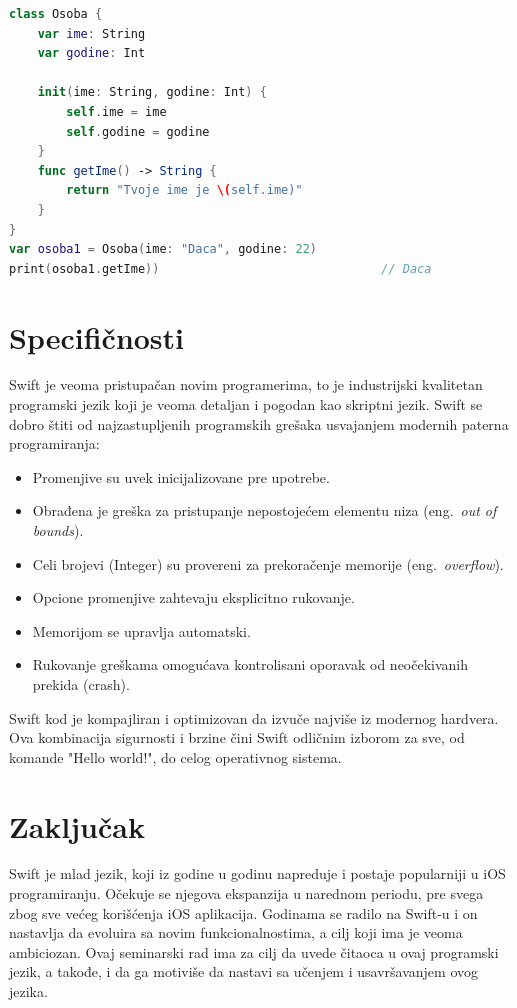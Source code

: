 \documentclass[a4paper]{article}
\begin{document}
\begin{lstlisting}[language=Swift, caption={Klasa},frame=single, label=simple]
class Osoba {
    var ime: String
    var godine: Int
    
    init(ime: String, godine: Int) {
        self.ime = ime
        self.godine = godine
    }
    func getIme() -> String {
        return "Tvoje ime je \(self.ime)"
	}
}
var osoba1 = Osoba(ime: "Daca", godine: 22)
print(osoba1.getIme))								// Daca
\end{lstlisting}

\section{Specifičnosti}	
\label{sec:osmiDeo}
Swift je veoma pristupačan novim programerima, to je industrijski kvalitetan programski jezik koji je veoma detaljan i pogodan kao skriptni jezik. Swift se dobro štiti od najzastupljenih programskih grešaka usvajanjem modernih paterna programiranja:
\begin{itemize}
\item Promenjive su uvek inicijalizovane pre upotrebe.
\item Obrađena je greška za pristupanje nepostojećem elementu niza (eng.~{\em out of bounds}).
\item Celi brojevi (Integer) su provereni za prekoračenje memorije (eng.~{\em overflow}).
\item Opcione promenjive zahtevaju eksplicitno rukovanje.
\item Memorijom se upravlja automatski.
\item Rukovanje greškama omogućava kontrolisani oporavak od neočekivanih prekida (crash).
\end{itemize}

Swift kod je kompajliran i optimizovan da izvuče najviše iz modernog hardvera. Ova kombinacija sigurnosti i brzine čini Swift odličnim izborom za sve, od komande "Hello world!", do celog operativnog sistema.

\section{Zaključak}
\label{sec:zakljucak}
Swift je mlad jezik, koji iz godine u godinu napreduje i postaje popularniji u iOS programiranju. Očekuje se njegova ekspanzija u narednom periodu, pre svega zbog sve većeg korišćenja iOS aplikacija. Godinama se radilo na Swift-u i on nastavlja da evoluira sa novim funkcionalnostima, a cilj koji ima je veoma ambiciozan. Ovaj seminarski rad ima za cilj da uvede čitaoca u ovaj programski jezik, a takođe, i da ga motiviše da nastavi sa učenjem i usavršavanjem ovog jezika. 

\appendix
 


\appendix
\end{document}
